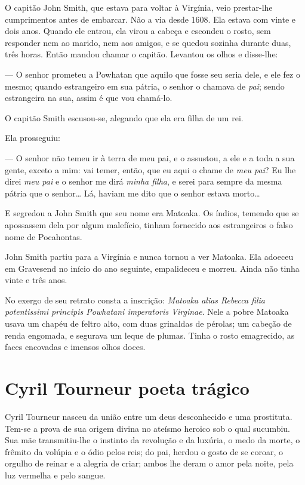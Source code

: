 O capitão John Smith, que estava para voltar à Virgínia, veio prestar-lhe
cumprimentos antes de embarcar. Não a via desde 1608. Ela estava com vinte
e dois anos. Quando ele entrou, ela virou a cabeça e escondeu o rosto, sem
responder nem ao marido, nem aos amigos, e se quedou sozinha durante duas,
três horas. Então mandou chamar o capitão. Levantou os olhos e disse-lhe:

--- O senhor prometeu a Powhatan que aquilo que fosse seu seria dele, e ele
fez o mesmo; quando estrangeiro em sua pátria, o senhor o chamava de
\textit{pai}; sendo estrangeira na sua, assim é que vou chamá-lo.

O capitão Smith escusou-se, alegando que ela era filha de um rei.

Ela prosseguiu:

--- O senhor não temeu ir à terra de meu pai, e o assustou, a ele e a toda a
sua gente, exceto a mim: vai temer, então, que eu aqui o chame de
\textit{meu pai}? Eu lhe direi \textit{meu pai} e o senhor me dirá
\textit{minha filha}, e serei para sempre da mesma pátria que o senhor\ldots{}
Lá, haviam me dito que o senhor estava morto\ldots{}

E segredou a John Smith que seu nome era Matoaka. Os índios, temendo que se
apossassem dela por algum malefício, tinham fornecido aos estrangeiros o
falso nome de Pocahontas.

John Smith partiu para a Virgínia e nunca tornou a ver Matoaka. Ela adoeceu
em Gravesend no início do ano seguinte, empalideceu e morreu. Ainda não
tinha vinte e três anos.

No exergo de seu retrato consta a inscrição: \textit{Matoaka alias Rebecca
filia potentissimi principis Powhatani imperatoris Virginae}. Nele a pobre
Matoaka usava um chapéu de feltro alto, com duas grinaldas de pérolas; um
cabeção de renda engomada, e segurava um leque de plumas. Tinha o rosto
emagrecido, as faces encovadas e imensos olhos doces.

\chapter{Cyril Tourneur poeta trágico}

Cyril Tourneur nasceu da união entre um deus desconhecido e uma prostituta.
Tem-se a prova de sua origem divina no ateísmo heroico sob o qual
sucumbiu. Sua mãe transmitiu-lhe o instinto da revolução e da luxúria, o
medo da morte, o frêmito da volúpia e o ódio pelos reis; do pai, herdou o
gosto de se coroar, o orgulho de reinar e a alegria de criar; ambos lhe
deram o amor pela noite, pela luz vermelha e pelo sangue.

